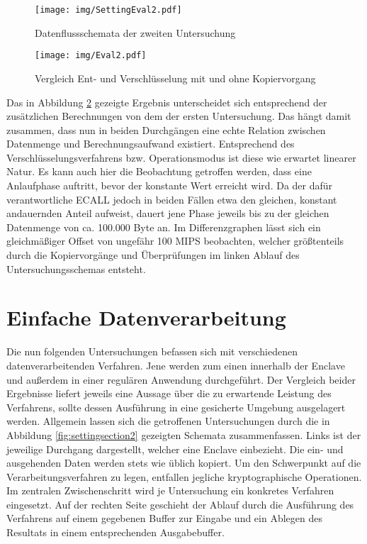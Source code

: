 \begin{figure}[h]
	\texttt{[image: img/SettingEval2.pdf]}
	\centering
	\caption{Datenflussschemata der zweiten Untersuchung}
	\label{fig:settingeval2}
\end{figure}

\begin{figure}[h]
	\texttt{[image: img/Eval2.pdf]}
	\centering
	\caption{Vergleich Ent- und Verschlüsselung mit und ohne Kopiervorgang}
	\label{fig:eval2}
\end{figure}

Das in Abbildung \ref{fig:eval2} gezeigte Ergebnis unterscheidet sich entsprechend der zusätzlichen Berechnungen von dem der ersten Untersuchung. Das hängt damit zusammen, dass nun in beiden Durchgängen eine echte Relation zwischen Datenmenge und Berechnungsaufwand existiert. Entsprechend des Verschlüsselungsverfahrens bzw. Operationsmodus ist diese wie erwartet linearer Natur. Es kann auch hier die Beobachtung getroffen werden, dass eine Anlaufphase auftritt, bevor der konstante Wert erreicht wird. Da der dafür verantwortliche \ac{ECALL} jedoch in beiden Fällen etwa den gleichen, konstant andauernden Anteil aufweist, dauert jene Phase jeweils bis zu der gleichen Datenmenge von ca. 100.000 Byte an. Im Differenzgraphen lässt sich ein gleichmäßiger Offset von ungefähr 100 \ac{MIPS} beobachten, welcher größtenteils durch die Kopiervorgänge und Überprüfungen im linken Ablauf des Untersuchungsschemas entsteht.

\section{Einfache Datenverarbeitung}

Die nun folgenden Untersuchungen befassen sich mit verschiedenen datenverarbeitenden Verfahren. Jene werden zum einen innerhalb der Enclave und außerdem in einer regulären Anwendung durchgeführt. Der Vergleich beider Ergebnisse liefert jeweils eine Aussage über die zu erwartende Leistung des Verfahrens, sollte dessen Ausführung in eine gesicherte Umgebung ausgelagert werden. Allgemein lassen sich die getroffenen Untersuchungen durch die in Abbildung \ref{fig:settingsection2} gezeigten Schemata zusammenfassen. Links ist der jeweilige Durchgang dargestellt, welcher eine Enclave einbezieht. Die ein- und ausgehenden Daten werden stets wie üblich kopiert. Um den Schwerpunkt auf die Verarbeitungsverfahren zu legen, entfallen jegliche kryptographische Operationen. Im zentralen Zwischenschritt wird je Untersuchung ein konkretes Verfahren eingesetzt. Auf der rechten Seite geschieht der Ablauf durch die Ausführung des Verfahrens auf einem gegebenen Buffer zur Eingabe und ein Ablegen des Resultats in einem entsprechenden Ausgabebuffer.

